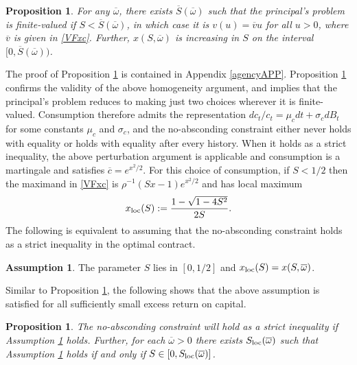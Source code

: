 \documentclass[11pt]{article}
\theoremstyle{plain}
\newtheorem{prop}[thm]{Proposition}
\theoremstyle{definition} %
\newtheorem{assump}{Assumption}[section]
\begin{document}
\begin{prop} \label{existence}
For any $\overline{\omega}$, there exists $\overline{S}(\overline{\omega})$ such that the principal's problem is finite-valued if $S < \overline{S}(\overline{\omega})$, in which case it is $v(u) = \overline{v}u$ for all $u > 0$, where $\overline{v}$ is given in \eqref{VFxc}. Further, $x(S,\overline{\omega})$ is increasing in $S$ on the interval $[0, \overline{S}(\overline{\omega}))$. 
\end{prop}

The proof of Proposition \ref{existence} is contained in Appendix \ref{agencyAPP}. Proposition \ref{existence} confirms the validity of the above homogeneity argument, and implies that the principal's problem reduces to making just two choices wherever it is finite-valued. Consumption therefore admits the representation $dc_t/c_t = \mu_cdt + \sigma_cdB_t$ for some constants $\mu_c$ and $\sigma_c$, and the no-absconding constraint either never holds with equality or holds with equality after every history. When it holds as a strict inequality, the above perturbation argument is applicable and consumption is a martingale and satisfies $\overline{c} = e^{x^2/2}$. For this choice of consumption, if $S < 1/2$ then the maximand in \eqref{VFxc} is $\rho^{-1}(Sx-1)e^{x^2/2}$ and has local maximum
\begin{equation}
x_{\textnormal{loc}}(S) := \frac{1 - \sqrt{1 - 4S^2}}{2S}.
\label{kcx}
\end{equation}
The following is equivalent to assuming that the no-absconding constraint holds as a strict inequality in the optimal contract. 

\begin{assump} \label{locfeas}%
The parameter $S$ lies in $[0, 1/2]$ and $x_{\textnormal{loc}}(S) = x(S,\overline{\omega})$. 
\end{assump}

Similar to Proposition \ref{existence}, the following shows that the above assumption is satisfied for all sufficiently small excess return on capital. 

\begin{prop}\label{suffLEM} 
The no-absconding constraint will hold as a strict inequality if Assumption \ref{locfeas} holds. Further, for each $\overline{\omega} > 0$ there exists $S_{\textnormal{loc}}(\overline{\omega})$ such that Assumption \ref{locfeas} holds if and only if $S \in [0, S_{\textnormal{loc}}(\overline{\omega})]$. 
\end{prop} 
\end{document}
